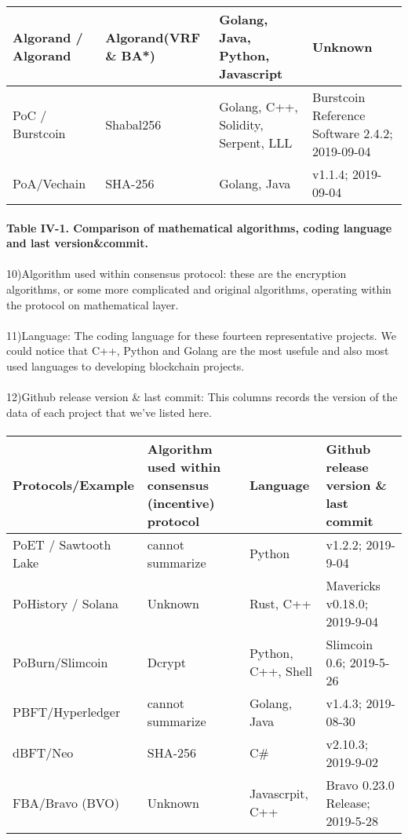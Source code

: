 \documentclass[]{article}
\begin{document}
\begin{CJK*}{UTF8}{gbsn}
\begin{tabular}{p{2cm}p{3cm}p{3cm}p{3cm}}
Algorand / Algorand & Algorand(VRF \& BA*) & Golang, Java, Python, Javascript & Unknown \\ \hline
PoC / Burstcoin & Shabal256 & Golang, C++, Solidity, Serpent, LLL & Burstcoin Reference Software 2.4.2; 2019-09-04 \\ \hline
PoA/Vechain & SHA-256 & Golang, Java & v1.1.4; 2019-09-04 \\ \hline
\end{tabular}
\paragraph{Table IV-1. Comparison of mathematical algorithms, coding language and last version\&commit.}
\paragraph{}
10)Algorithm used within consensus protocol: these are the encryption algorithms, or some more complicated and original algorithms, operating within the protocol on mathematical layer. 
\paragraph{}
11)Language: The coding language for these fourteen representative projects. We could notice that C++, Python and Golang are the most usefule and also most used languages to developing blockchain projects.
\paragraph{}
12)Github release version \& last commit: This columns records the version of the data of each project that we've listed here. 
\paragraph{}
\begin{tabular}{p{2cm}p{3cm}p{3cm}p{3cm}}
\hline
Protocols/E\-xample 
& Algorithm used within consensus (incentive) protocol 
& Language 
& Github release version \& last commit \\ \hline

PoET / Sawtooth Lake & cannot summarize & Python & v1.2.2; 2019-9-04\\ \hline
PoHistory / Solana & Unknown & Rust, C++ & Mavericks v0.18.0; 2019-9-04 \\ \hline
PoBurn/\newline Slimcoin &  Dcrypt & Python, C++, Shell & Slimcoin 0.6; 2019-5-26  \\ \hline
PBFT/Hyp\-erledger & cannot summarize & Golang, Java & v1.4.3; 2019-08-30  \\ \hline
dBFT/Neo & SHA-256 & C\# &  v2.10.3; 2019-9-02  \\ \hline
FBA/Bravo (BVO) & Unknown & Javascrpit, C++ & Bravo 0.23.0 Release; 2019-5-28 \\ \hline


\end{tabular}
\end{CJK*}
\end{document}
